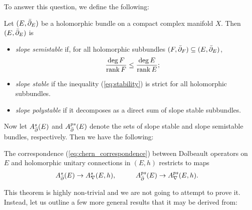 \documentclass[12pt]{ociamthesis}  %
\begin{document}
To answer this question, we define the following:
\begin{definition}\label{def:stable_bundle}
  Let $(E,{\bar{\partial}}_E)$ be a holomorphic bundle on a compact complex
  manifold $X$. Then $(E,{\bar{\partial}}_E)$ is
  \begin{itemize}
    \item \emph{slope semistable} if, for all holomorphic subbundles
          $(F,{\bar{\partial}}_F)\subseteq (E,{\bar{\partial}}_E)$,
          \begin{align}\label{eq:stability}
            \frac{\deg F}{\operatorname{rank} F} \leq \frac{\deg E}{\operatorname{rank} E};
          \end{align}
    \item \emph{slope stable} if the inequality (\ref{eq:stability})
          is strict for all holomorphic subbundles.
    \item \emph{slope polystable} if it decomposes as a direct sum
          of slope stable subbundles.
  \end{itemize}
\end{definition}

Now let $A^s_{\bar{\partial}}(E)$ and $A^{ps}_{\bar{\partial}}(E)$ denote the sets of slope stable
and slope semistable bundles, respectively.
Then we have the following:

\begin{theorem}\label{thm:duy}
  The correspondence (\ref{eq:chern_correspondence}) between
  Dolbeault operators on $E$ and holomorphic unitary connections in $(E,h)$
  restricts to maps
  \begin{align}\label{eq:duy}
    A^s_{\bar{\partial}}(E) \to A^s_\nabla(E,h), \hspace{1cm}
    A^{ps}_{\bar{\partial}}(E) \to A^{ps}_\nabla(E,h).
  \end{align}
\end{theorem}

This theorem is highly non-trivial and we are not going to attempt
to prove it. Instead, let us outline a few more general results
that it may be derived from:
\end{document}
